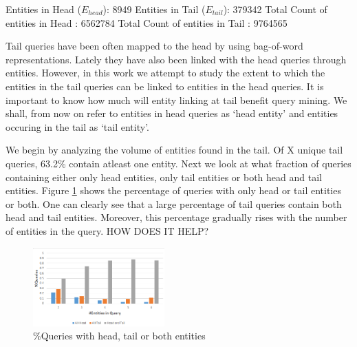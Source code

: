 





Entities in Head ($E_{head}$): 8949
Entities in Tail ($E_{tail}$): 379342
Total Count of entities in Head : 6562784
Total Count of entities in Tail : 9764565





Tail queries have been often mapped to the head \cite{} by using bag-of-word representations.
Lately they have also been linked with the head queries through entities. However, in this work
we attempt to study the extent to which the entities in the tail queries can be linked to entities 
in the head queries. It is important to know how much will entity linking at tail benefit query mining. 
We shall, from now on refer to entities in head queries as `head entity' 
and entities occuring in the tail as `tail entity'. 


We begin by analyzing the volume of entities found in the tail. Of X unique tail queries,
63.2\% contain atleast one entity. 
Next we look at what fraction of queries containing either only head entities, only tail entities 
or both head and tail entities. Figure \ref{img:headTailEntPercent} shows the percentage of 
queries with only head or tail entities or both. One can clearly see that a large percentage of tail 
queries contain both head and tail entities. Moreover, this percentage gradually rises with the 
number of entities in the query. HOW DOES IT HELP?

\begin{figure}[t]
\label{img:headTailEntPercent}
\caption{\%Queries with head, tail or both entities}
  \centering
    \includegraphics[width = 0.45\textwidth]{images/entity-head-tail-count.png}
\end{figure}
 
